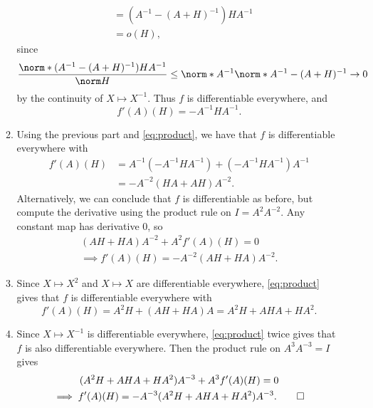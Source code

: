 \documentclass[12pt]{article}
\begin{document}
\begin{solution}
\begin{enumerate}
\begin{enumerate}
\begin{align*}
                &= (A^{-1} - (A + H)^{-1})HA^{-1} \\
                &= o(H),
            \end{align*}
            since \[
                \frac{\norm*{(A^{-1} - (A + H)^{-1})HA^{-1}}}{\norm H}
                \le \norm*{A^{-1}} \norm*{A^{-1} - (A + H)^{-1}} \to 0
            \] by the continuity of $X \mapsto X^{-1}$.
            Thus $f$ is differentiable everywhere, and \[
                f'(A)(H) = -A^{-1}HA^{-1}.
            \]
            \item Using the previous part and \eqref{eq:product}, we have
            that $f$ is differentiable everywhere with \begin{align*}
                f'(A)(H) &= A^{-1}(-A^{-1}HA^{-1})+(-A^{-1}HA^{-1})A^{-1} \\
                    &= -A^{-2}(HA + AH)A^{-2}.
            \end{align*}
            Alternatively, we can conclude that $f$ is differentiable
            as before, but compute the derivative using the product rule
            on $I = A^2 A^{-2}$.
            Any constant map has derivative $0$, so \begin{gather*}
                (AH + HA) A^{-2} + A^2 f'(A)(H) = 0 \\
                \implies f'(A)(H) = -A^{-2}(AH + HA)A^{-2}.
            \end{gather*}
            \item Since $X \mapsto X^2$ and $X \mapsto X$ are differentiable
            everywhere, \eqref{eq:product} gives that $f$ is differentiable
            everywhere with \[
                f'(A)(H) = A^2H + (AH + HA) A = A^2H + AHA + HA^2.
            \]
            \item Since $X \mapsto X^{-1}$ is differentiable everywhere,
            \eqref{eq:product} twice gives that $f$ is also differentiable
            everywhere.
            Then the product rule on $A^3 A^{-3} = I$ gives \begin{gather*}
                (A^2H + AHA + HA^2)A^{-3} + A^3 f'(A)(H) = 0 \\
                \implies f'(A)(H) = -A^{-3}(A^2H + AHA + HA^2)A^{-3}.
                \qedhere
            \end{gather*}
        \end{enumerate}
    \end{enumerate}
\end{solution}
\end{document}
